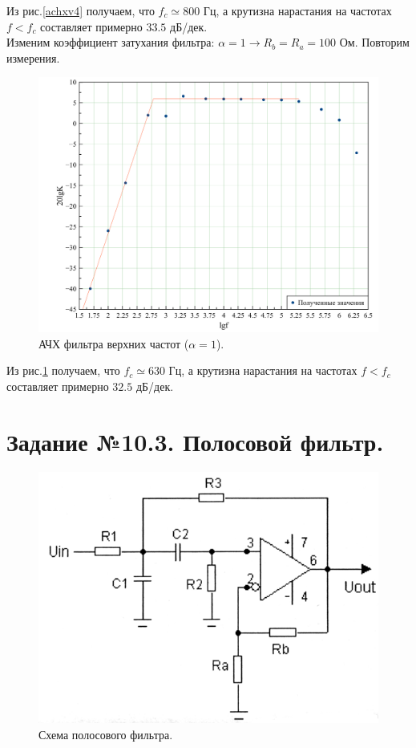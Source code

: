 \documentclass[a4paper, 12pt, twoside]{article}
\begin{document}
Из рис.\ref{achxv4} получаем, что $f_c \simeq 800$ Гц, а крутизна нарастания на частотах $f<f_c$ составляет примерно $33.5$ дБ/дек. \\


Изменим коэффициент затухания фильтра: $\alpha = 1 \rightarrow R_b = R_a = 100$ Ом. Повторим измерения.

\begin{table}[H]
	\centering
	\caption{АЧХ фильтра верхних частот ($\alpha = 1$).}
\end{table}

\begin{figure}[H]
	\centering
	\includegraphics[width = 0.7\linewidth]{1022}
	\caption{АЧХ фильтра верхних частот ($\alpha = 1$).}
	\label{achxv41}
	
\end{figure}

Из рис.\ref{achxv41} получаем, что $f_c \simeq 630$ Гц, а крутизна нарастания на частотах $f<f_c$ составляет примерно $32.5$ дБ/дек. 

\newpage

\section*{Задание №10.3. Полосовой фильтр.}
\begin{figure}[H]
	\centering
	\includegraphics[width =  0.3\linewidth]{IMG_0665}
	\caption{Схема полосового фильтра.}
	
\end{figure}
\end{document}
